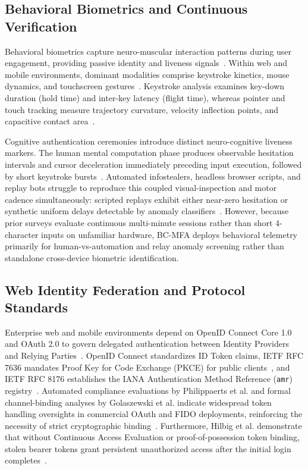\subsection{Behavioral Biometrics and Continuous Verification}
Behavioral biometrics capture neuro-muscular interaction patterns during user engagement, providing passive identity and liveness signals~\cite{syed2022zero}. Within web and mobile environments, dominant modalities comprise keystroke kinetics, mouse dynamics, and touchscreen gestures~\cite{incel2021dakota, khan2024mouse}. Keystroke analysis examines key-down duration (hold time) and inter-key latency (flight time), whereas pointer and touch tracking measure trajectory curvature, velocity inflection points, and capacitive contact area~\cite{incel2021dakota, khan2024mouse}.

Cognitive authentication ceremonies introduce distinct neuro-cognitive liveness markers. The human mental computation phase produces observable hesitation intervals and cursor deceleration immediately preceding input execution, followed by short keystroke bursts~\cite{khan2024mouse}. Automated infostealers, headless browser scripts, and replay bots struggle to reproduce this coupled visual-inspection and motor cadence simultaneously: scripted replays exhibit either near-zero hesitation or synthetic uniform delays detectable by anomaly classifiers~\cite{incel2021dakota, khan2024mouse}. However, because prior surveys evaluate continuous multi-minute sessions rather than short 4-character inputs on unfamiliar hardware, BC-MFA deploys behavioral telemetry primarily for human-vs-automation and relay anomaly screening rather than standalone cross-device biometric identification.

\subsection{Web Identity Federation and Protocol Standards}
Enterprise web and mobile environments depend on OpenID Connect Core 1.0 and OAuth 2.0 to govern delegated authentication between Identity Providers and Relying Parties~\cite{jannett2024sok, oidc_core1, rfc6749oauth}. OpenID Connect standardizes ID Token claims, IETF RFC 7636 mandates Proof Key for Code Exchange (PKCE) for public clients~\cite{rfc7636pkce}, and IETF RFC 8176 establishes the IANA Authentication Method Reference (\texttt{amr}) registry~\cite{rfc8176amr}. Automated compliance evaluations by Philippaerts et al. and formal channel-binding analyses by Golaszewski et al. indicate widespread token handling oversights in commercial OAuth and FIDO deployments, reinforcing the necessity of strict cryptographic binding~\cite{philippaerts2022oauch, golaszewski2026binding}. Furthermore, Hilbig et al. demonstrate that without Continuous Access Evaluation or proof-of-possession token binding, stolen bearer tokens grant persistent unauthorized access after the initial login completes~\cite{hilbig2023protect}.

